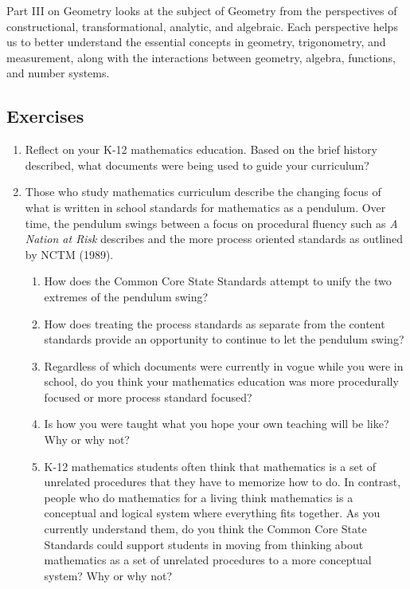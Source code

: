 \documentclass[
]{book}
\providecommand{\tightlist}{%
  \setlength{\itemsep}{0pt}\setlength{\parskip}{0pt}}
\theoremstyle{definition}
\theoremstyle{definition}
\theoremstyle{definition}
\theoremstyle{definition}
\theoremstyle{remark}
\begin{document}
Part III on Geometry looks at the subject of Geometry from the perspectives of constructional, transformational, analytic, and algebraic. Each perspective helps us to better understand the essential concepts in geometry, trigonometry, and measurement, along with the interactions between geometry, algebra, functions, and number systems.

\hypertarget{exercises-2}{%
\subsection{Exercises}\label{exercises-2}}

\begin{enumerate}
\def\labelenumi{\arabic{enumi}.}
\item
  Reflect on your K-12 mathematics education. Based on the brief history described, what documents were being used to guide your curriculum?
\item
  Those who study mathematics curriculum describe the changing focus of what is written in school standards for mathematics as a pendulum. Over time, the pendulum swings between a focus on procedural fluency such as \emph{A Nation at Risk} \citeyearpar{NCEE1983} describes and the more process oriented standards as outlined by NCTM (1989).

  \begin{enumerate}
  \def\labelenumii{\alph{enumii})}
  \tightlist
  \item
    How does the Common Core State Standards attempt to unify the two extremes of the pendulum swing?
  \item
    How does treating the process standards as separate from the content standards provide an opportunity to continue to let the pendulum swing?
  \item
    Regardless of which documents were currently in vogue while you were in school, do you think your mathematics education was more procedurally focused or more process standard focused?
  \item
    Is how you were taught what you hope your own teaching will be like? Why or why not?
  \item
    K-12 mathematics students often think that mathematics is a set of unrelated procedures that they have to memorize how to do. In contrast, people who do mathematics for a living think mathematics is a conceptual and logical system where everything fits together. As you currently understand them, do you think the Common Core State Standards could support students in moving from thinking about mathematics as a set of unrelated procedures to a more conceptual system? Why or why not?
  \end{enumerate}
\end{enumerate}
\end{document}
